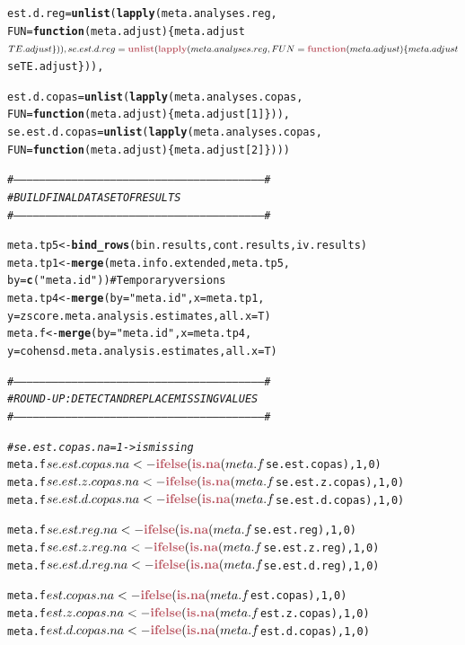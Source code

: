 \documentclass[11pt,a4paper,twoside]{book}\usepackage[]{graphicx}\usepackage[]{color}
\makeatletter
\newcommand{\hlstr}[1]{\textcolor[rgb]{0.192,0.494,0.8}{#1}}%
\newcommand{\hlcom}[1]{\textcolor[rgb]{0.678,0.584,0.686}{\textit{#1}}}%
\newcommand{\hlkwd}[1]{\textcolor[rgb]{0.737,0.353,0.396}{\textbf{#1}}}%
\newenvironment{kframe}{%
 \def\at@end@of@kframe{}%
 \ifinner\ifhmode%
  \def\at@end@of@kframe{\end{minipage}}%
  \begin{minipage}{\columnwidth}%
 \fi\fi%
 \def\FrameCommand##1{\hskip\@totalleftmargin \hskip-\fboxsep
 \colorbox{shadecolor}{##1}\hskip-\fboxsep
     \hskip-\linewidth \hskip-\@totalleftmargin \hskip\columnwidth}%
 \MakeFramed {\advance\hsize-\width
   \@totalleftmargin\z@ \linewidth\hsize
   \@setminipage}}%
 {\par\unskip\endMakeFramed%
 \at@end@of@kframe}
\newenvironment{knitrout}{}{} %
\makeatother
\begin{document}
\begin{knitrout}
\begin{kframe}
\begin{alltt}
  est.d.reg = \hlkwd{unlist}(\hlkwd{lapply}(meta.analyses.reg, 
                  FUN = \hlkwd{function}(meta.adjust)\{meta.adjust$TE.adjust\})),
  se.est.d.reg = \hlkwd{unlist}(\hlkwd{lapply}(meta.analyses.reg, 
                  FUN = \hlkwd{function}(meta.adjust)\{meta.adjust$seTE.adjust\})),
  
  est.d.copas = \hlkwd{unlist}(\hlkwd{lapply}(meta.analyses.copas, 
                  FUN = \hlkwd{function}(meta.adjust)\{meta.adjust[1]\})),
  se.est.d.copas = \hlkwd{unlist}(\hlkwd{lapply}(meta.analyses.copas, 
                  FUN = \hlkwd{function}(meta.adjust)\{meta.adjust[2]\})))


\hlcom{#--------------------------------------------------------------------------------------------------------------------#}
\hlcom{# BUILD FINAL DATASET OF RESULTS}
\hlcom{#--------------------------------------------------------------------------------------------------------------------#}

meta.tp5 <- \hlkwd{bind_rows}(bin.results, cont.results, iv.results)
meta.tp1 <- \hlkwd{merge}(meta.info.extended, meta.tp5, 
                  by = \hlkwd{c}(\hlstr{"meta.id"})) #Temporary versions
meta.tp4 <- \hlkwd{merge}(by = \hlstr{"meta.id"}, x = meta.tp1, 
                  y = zscore.meta.analysis.estimates, all.x = T)
meta.f <- \hlkwd{merge}(by = \hlstr{"meta.id"}, x = meta.tp4, 
                y = cohensd.meta.analysis.estimates, all.x = T)

\hlcom{#--------------------------------------------------------------------------------------------------------------------#}
\hlcom{# ROUND-UP: DETECT AND REPLACE MISSING VALUES}
\hlcom{#--------------------------------------------------------------------------------------------------------------------#}

\hlcom{#se.est.copas.na = 1 -> is missing}
meta.f$se.est.copas.na <- \hlkwd{ifelse}(\hlkwd{is.na}(meta.f$se.est.copas), 1, 0) 
meta.f$se.est.z.copas.na <- \hlkwd{ifelse}(\hlkwd{is.na}(meta.f$se.est.z.copas), 1, 0)
meta.f$se.est.d.copas.na <- \hlkwd{ifelse}(\hlkwd{is.na}(meta.f$se.est.d.copas), 1, 0)

meta.f$se.est.reg.na <- \hlkwd{ifelse}(\hlkwd{is.na}(meta.f$se.est.reg), 1, 0)
meta.f$se.est.z.reg.na <- \hlkwd{ifelse}(\hlkwd{is.na}(meta.f$se.est.z.reg), 1, 0)
meta.f$se.est.d.reg.na <- \hlkwd{ifelse}(\hlkwd{is.na}(meta.f$se.est.d.reg), 1, 0)

meta.f$est.copas.na <- \hlkwd{ifelse}(\hlkwd{is.na}(meta.f$est.copas), 1, 0)
meta.f$est.z.copas.na <- \hlkwd{ifelse}(\hlkwd{is.na}(meta.f$est.z.copas), 1, 0)
meta.f$est.d.copas.na <- \hlkwd{ifelse}(\hlkwd{is.na}(meta.f$est.d.copas), 1, 0)


\end{alltt}
\end{kframe}
\end{knitrout}
\end{document}
